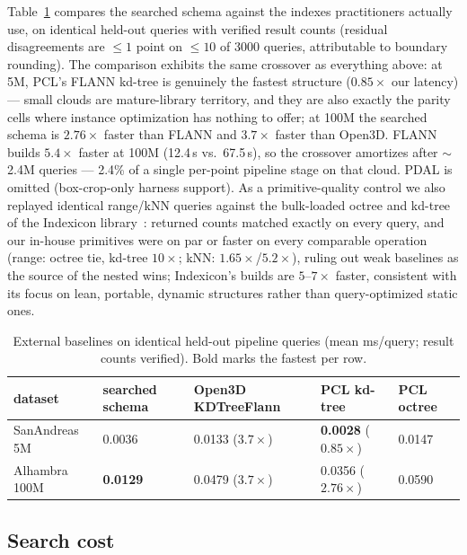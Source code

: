 Table~\ref{tab:frameworks} compares the searched schema against the indexes practitioners actually use, on identical held-out queries with verified result counts (residual disagreements are $\leq 1$ point on $\leq 10$ of 3000 queries, attributable to boundary rounding). The comparison exhibits the same crossover as everything above: at 5M, PCL's FLANN kd-tree is genuinely the fastest structure ($0.85\times$ our latency) --- small clouds are mature-library territory, and they are also exactly the parity cells where instance optimization has nothing to offer; at 100M the searched schema is $2.76\times$ faster than FLANN and $3.7\times$ faster than Open3D. FLANN builds $5.4\times$ faster at 100M (12.4\,s vs.\ 67.5\,s), so the crossover amortizes after $\sim$2.4M queries --- 2.4\% of a single per-point pipeline stage on that cloud. PDAL is omitted (box-crop-only harness support). As a primitive-quality control we also replayed identical range/kNN queries against the bulk-loaded octree and kd-tree of the Indexicon library~\cite{indexicon2026}: returned counts matched exactly on every query, and our in-house primitives were on par or faster on every comparable operation (range: octree tie, kd-tree $10\times$; kNN: $1.65\times$/$5.2\times$), ruling out weak baselines as the source of the nested wins; Indexicon's builds are $5$--$7\times$ faster, consistent with its focus on lean, portable, dynamic structures rather than query-optimized static ones.

\begin{table}[t]
  \centering
  \caption{External baselines on identical held-out pipeline queries (mean ms/query; result counts verified). Bold marks the fastest per row.}
  \label{tab:frameworks}
  \small
  \begin{tabular}{lllll}
    \toprule
    dataset & searched schema & Open3D KDTreeFlann & PCL kd-tree & PCL octree \\
    \midrule
    SanAndreas 5M  & 0.0036 & 0.0133 ($3.7\times$) & \textbf{0.0028} ($0.85\times$) & 0.0147 \\
    Alhambra 100M  & \textbf{0.0129} & 0.0479 ($3.7\times$) & 0.0356 ($2.76\times$) & 0.0590 \\
    \bottomrule
  \end{tabular}
\end{table}

\subsection{Search cost}
\label{sec:eval-search-cost}

